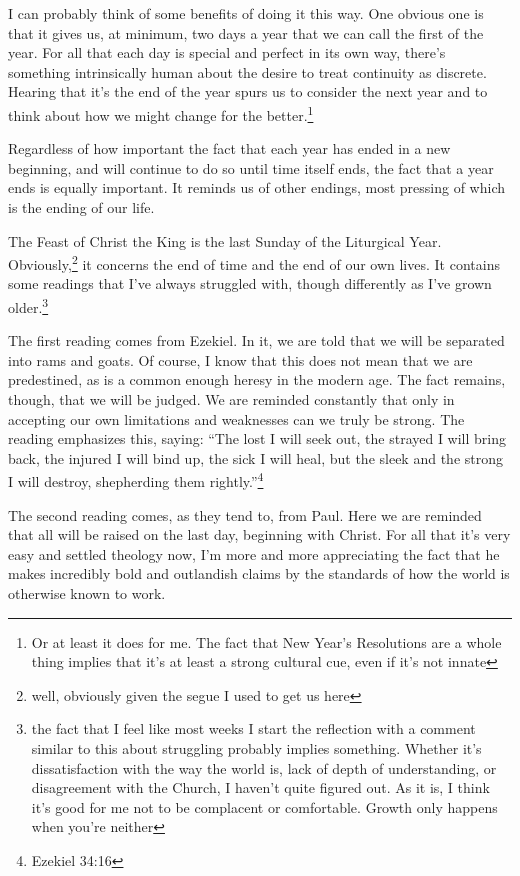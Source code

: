 \documentclass[12pt]{article}[titlepage]
\newcommand{\say}[1]{``#1''}
\newcommand{\1}{\={a}}
\newcommand{\2}{\={e}}
\newcommand{\3}{\={\i}}
\newcommand{\4}{\=o}
\newcommand{\5}{\=u}
\newcommand{\6}{\={A}}
\renewcommand{\,}{\textsuperscript{,}}
\begin{document}
I can probably think of some benefits of doing it this way.
One obvious one is that it gives us, at minimum, two days a year that we can call the first of the year.
For all that each day is special and perfect in its own way, there's something intrinsically human about the desire to treat continuity as discrete.
Hearing that it's the end of the year spurs us to consider the next year and to think about how we might change for the better.\footnote{Or at least it does for me.
The fact that New Year's Resolutions are a whole thing implies that it's at least a strong cultural cue, even if it's not innate}

Regardless of how important the fact that each year has ended in a new beginning, and will continue to do so until time itself ends, the fact that a year ends is equally important.
It reminds us of other endings, most pressing of which is the ending of our life.

The Feast of Christ the King is the last Sunday of the Liturgical Year.
Obviously,\footnote{well, obviously given the segue I used to get us here} it concerns the end of time and the end of our own lives.
It contains some readings that I've always struggled with, though differently as I've grown older.\footnote{the fact that I feel like most weeks I start the reflection with a comment similar to this about struggling probably implies something.
Whether it's dissatisfaction with the way the world is, lack of depth of understanding, or disagreement with the Church, I haven't quite figured out.
As it is, I think it's good for me not to be complacent or comfortable.
Growth only happens when you're neither}

The first reading comes from Ezekiel.
In it, we are told that we will be separated into rams and goats.
Of course, I know that this does not mean that we are predestined, as is a common enough heresy in the modern age.
The fact remains, though, that we will be judged.
We are reminded constantly that only in accepting our own limitations and weaknesses can we truly be strong.
The reading emphasizes this, saying: \say{The lost I will seek out, the strayed I will bring back, the injured I will bind up, the sick I will heal, but the sleek and the strong I will destroy, shepherding them rightly.}\footnote{Ezekiel 34:16}

The second reading comes, as they tend to, from Paul.
Here we are reminded that all will be raised on the last day, beginning with Christ.
For all that it's very easy and settled theology now, I'm more and more appreciating the fact that he makes incredibly bold and outlandish claims by the standards of how the world is otherwise known to work.
\end{document}
